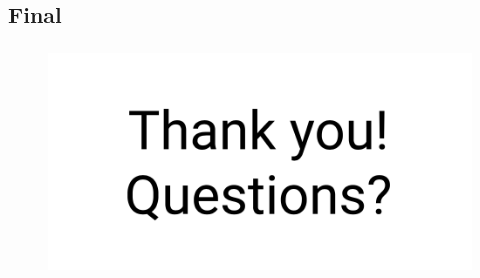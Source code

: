 \documentclass[professionalfont]{beamer}
\begin{document}
    \subsection{Final}
      \begin{frame}
          \frametitle{}
          \begin{center}
              \begin{figure}
                \includegraphics[scale=0.5]{figures/thanks.png}
              \end{figure}
          \end{center}
      \end{frame}
\end{document}
